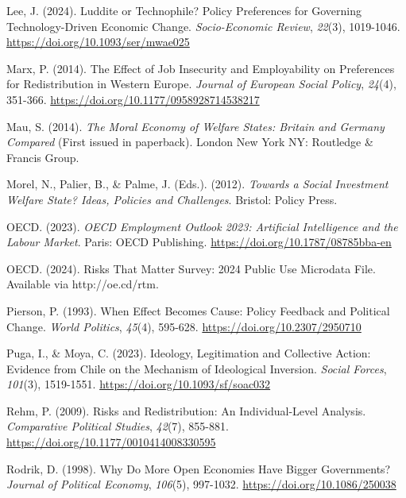 \documentclass[
  spanish,
  12pt,
]{article}
\newlength{\cslhangindent}
\newenvironment{CSLReferences}[2] %
 {\begin{list}{}{%
  \setlength{\itemindent}{0pt}
  \setlength{\leftmargin}{0pt}
  \setlength{\parsep}{0pt}
  \ifodd #1
   \setlength{\leftmargin}{\cslhangindent}
   \setlength{\itemindent}{-1\cslhangindent}
  \fi
  \setlength{\itemsep}{#2\baselineskip}}}
 {\end{list}}
\begin{document}
\begin{CSLReferences}{1}{0}
Lee, J. (2024). Luddite or Technophile? {Policy} Preferences for
Governing Technology-Driven Economic Change. \emph{Socio-Economic
Review}, \emph{22}(3), 1019-1046.
\url{https://doi.org/10.1093/ser/mwae025}

Marx, P. (2014). The Effect of Job Insecurity and Employability on
Preferences for Redistribution in {Western Europe}. \emph{Journal of
European Social Policy}, \emph{24}(4), 351-366.
\url{https://doi.org/10.1177/0958928714538217}

Mau, S. (2014). \emph{The Moral Economy of Welfare States: {Britain} and
{Germany} Compared} (First issued in paperback). London New York NY:
Routledge \& Francis Group.

Morel, N., Palier, B., \& Palme, J. (Eds.). (2012). \emph{Towards a
Social Investment Welfare State? {Ideas}, Policies and Challenges}.
Bristol: Policy Press.

OECD. (2023). \emph{{OECD Employment Outlook} 2023: {Artificial}
Intelligence and the Labour Market}. Paris: OECD Publishing.
\url{https://doi.org/10.1787/08785bba-en}

OECD. (2024). Risks That {Matter Survey}: 2024 {Public Use Microdata
File}. {Available} via {http://oe.cd/rtm}.

Pierson, P. (1993). When Effect Becomes Cause: {Policy} Feedback and
Political Change. \emph{World Politics}, \emph{45}(4), 595-628.
\url{https://doi.org/10.2307/2950710}

Puga, I., \& Moya, C. (2023). Ideology, Legitimation and Collective
Action: {Evidence} from {Chile} on the Mechanism of Ideological
Inversion. \emph{Social Forces}, \emph{101}(3), 1519-1551.
\url{https://doi.org/10.1093/sf/soac032}

Rehm, P. (2009). Risks and {Redistribution}: {An Individual-Level
Analysis}. \emph{Comparative Political Studies}, \emph{42}(7), 855-881.
\url{https://doi.org/10.1177/0010414008330595}

Rodrik, D. (1998). Why Do {More Open Economies Have Bigger Governments}?
\emph{Journal of Political Economy}, \emph{106}(5), 997-1032.
\url{https://doi.org/10.1086/250038}


\end{CSLReferences}
\end{document}
